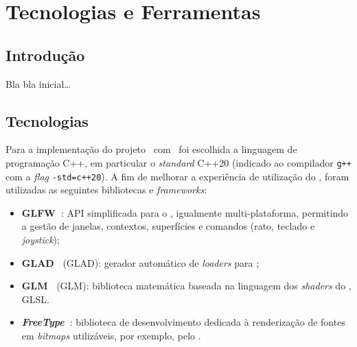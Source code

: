 \chapter{Tecnologias e Ferramentas}
\label{ch::tecno}

\section{Introdução}
\label{sec::tecno:intro}

Bla bla inicial\ldots


\section{Tecnologias}
\label{sec::tecno:tecno}

Para a implementação do projeto \theapp~com \opengl~foi escolhida a linguagem de programação C++, em particular o \textit{standard} C++20 (indicado ao compilador \verb|g++| com a \textit{flag} \verb|-std=c++20|). A fim de melhorar a experiência de utilização do \opengl, foram utilizadas as seguintes bibliotecas e \textit{frameworks}:

\begin{itemize}
    
    \item \textbf{GLFW~\cite{glfw}}: \ac{API} simplificada para o \opengl, igualmente multi-plataforma, permitindo a gestão de janelas, contextos, superfícies e comandos (rato, teclado e \textit{joystick});
    
    \item \textbf{\acs{GLAD}~\cite{glad,glad-webservice}} (\acl{GLAD}): gerador automático de \textit{loaders} para \opengl;
    
    \item \textbf{\acs{GLM}~\cite{glm}} (\acl{GLM}): biblioteca matemática baseada na linguagem dos \textit{shaders} do \opengl, \ac{GLSL}.
    
    \item \textbf{\textit{FreeType}~\cite{freetype}}: biblioteca de desenvolvimento dedicada à renderização de fontes em \textit{bitmaps} utilizáveis, por exemplo, pelo \opengl.
    
    
\end{itemize}

